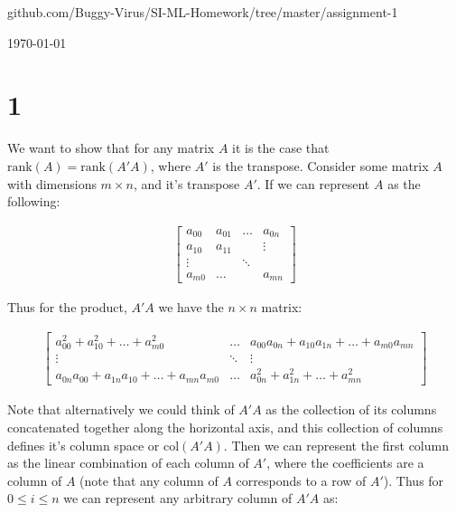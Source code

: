\documentclass[11pt]{article} %
\newcommand{\problem}[1]{\section{#1}}		%
\begin{document}
\centerline{\LARGE\thishw}
\centerline{github.com/Buggy-Virus/SI-ML-Homework/tree/master/assignment-1}
\centerline{\today}

\problem{1}
\begin{enumerate}
    We want to show that for any matrix $A$ it is the case that $\text{rank}(A) = \text{rank}(A'A)$, where $A'$ is the transpose. Consider some matrix $A$ with dimensions $m \times n$, and it's transpose $A'$. If we can represent $A$ as the following:

    \begin{align*}
        \begin{bmatrix}
            a_{00} & a_{01} & \dots  & a_{0n}  \\
            a_{10} & a_{11} &        & \vdots  \\
            \vdots  &       & \ddots &         \\
            a_{m0} & \dots  &        & a_{mn}
        \end{bmatrix}
    \end{align*}

    Thus for the product, $A'A$ we have the $n \times n$ matrix:

    \begin{align*}
        \begin{bmatrix}
            a_{00}^2 + a_{10}^2 + \dots + a_{m0}^2             & \dots  & a_{00}a_{0n} + a_{10}a_{1n} + \dots + a_{m0}a_{mn}  \\
            \vdots                                             & \ddots & \vdots \\
            a_{0n}a_{00} + a_{1n}a_{10} + \dots + a_{mn}a_{m0} & \dots  & a_{0n}^2 + a_{1n}^2 + \dots + a_{mn}^2
        \end{bmatrix}
    \end{align*}

    Note that alternatively we could think of $A'A$ as the collection of its columns concatenated together along the horizontal axis, and this collection of columns defines it's column space or $\text{col}(A'A)$. Then we can represent the first column as the linear combination of each column of $A'$, where the coefficients are a column of $A$ (note that any column of $A$ corresponds to a row of $A'$). Thus for $0 \leq i \leq n$ we can represent any arbitrary column of $A'A$ as:


\end{enumerate}
\end{document}
